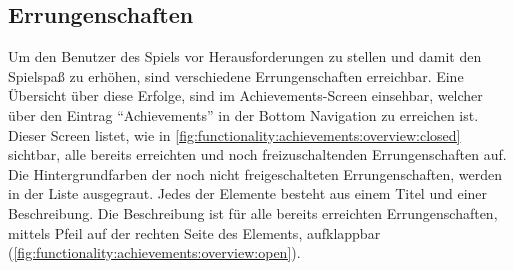 \documentclass[a4paper]{article}
\begin{document}
\subsection{Errungenschaften}
\label{subsec:functionality:achievements}
Um den Benutzer des Spiels vor Herausforderungen zu stellen und damit den Spielspaß zu erhöhen, sind verschiedene Errungenschaften erreichbar. Eine Übersicht über diese Erfolge, sind im Achievements-Screen einsehbar, welcher über den Eintrag "`Achievements"' in der Bottom Navigation zu erreichen ist. Dieser Screen listet, wie in \autoref{fig:functionality:achievements:overview:closed} sichtbar, alle bereits erreichten und noch freizuschaltenden Errungenschaften auf. Die Hintergrundfarben der noch nicht freigeschalteten Errungenschaften, werden in der Liste ausgegraut. Jedes der Elemente besteht aus einem Titel und einer Beschreibung. Die Beschreibung ist für alle bereits erreichten Errungenschaften, mittels Pfeil auf der rechten Seite des Elements, aufklappbar (\autoref{fig:functionality:achievements:overview:open}).
\end{document}

